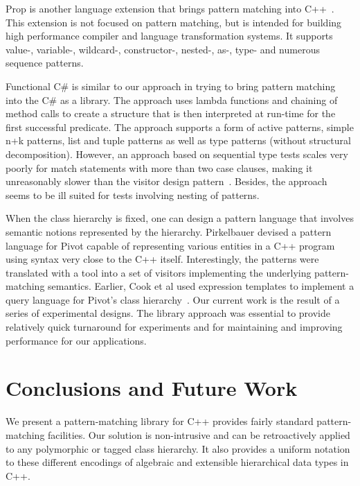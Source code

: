\documentclass{llncs}
\begin{document}
Prop is another language extension that brings pattern matching into 
C++~\cite{Prop96}. This extension is not focused on pattern 
matching, but is intended for building high performance 
compiler and language transformation systems. It supports value-, variable-, 
wildcard-, constructor-, nested-, as-, type- and numerous sequence patterns.

Functional C\# is similar to our approach in trying to bring pattern matching 
into the C\# as a library\cite{FuncCSharp}. The approach uses lambda functions 
and chaining of method calls to create a structure that is then interpreted at 
run-time for the first successful predicate. The approach supports a form of 
active patterns, simple n+k patterns, list and tuple patterns as well as type 
patterns (without structural decomposition). 
However, an approach based on sequential type tests 
scales very poorly for match statements with more than two case clauses, making 
it unreasonably slower than the visitor design pattern~\cite{TypeSwitch}. Besides, the approach 
seems to be ill suited for tests involving nesting of patterns.

When the class hierarchy is fixed, one can design a pattern language that involves 
semantic notions represented by the hierarchy. Pirkelbauer devised a pattern 
language for Pivot capable of representing various entities in a C++ program using syntax very close to the C++ itself. 
Interestingly, the patterns were translated with a tool into a set of visitors 
implementing the underlying pattern-matching semantics\cite{PirkelbauerThesis}. 
Earlier, Cook et al used expression templates to implement a query language for 
Pivot's class hierarchy~\cite{iql04}. Our current work is the result of a series 
of experimental designs. The library approach was essential to provide 
relatively quick turnaround for experiments and for maintaining and improving 
performance for our applications.

\section{Conclusions and Future Work} %
\label{sec:cc}

We present a pattern-matching library for C++ provides fairly standard
pattern-matching facilities. Our solution is 
non-intrusive and can be retroactively applied to any polymorphic or tagged 
class hierarchy. It also provides a uniform notation to these different 
encodings of algebraic and extensible hierarchical data types in C++.
\end{document}
